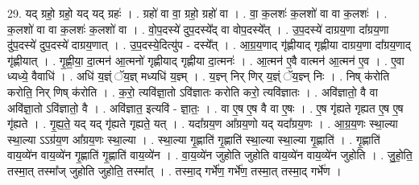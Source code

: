 \documentclass[17pt]{extarticle}
\begin{document}
29. यद् ग्रहो॒ ग्रहो॒ यद् यद् ग्रहः॑ । . ग्रहो॑ वा वा॒ ग्रहो॒ ग्रहो॑ वा । . वा॒ क॒लशः॑ क॒लशो॑ वा वा क॒लशः॑ । . क॒लशो॑ वा वा क॒लशः॑ क॒लशो॑ वा । . वो॒प॒दस्ये॑ दुप॒दस्ये᳚द् वा वोप॒दस्ये᳚त् । . उ॒प॒दस्ये॑ दाग्रय॒णा दा᳚ग्रय॒णा दु॑प॒दस्ये॑ दुप॒दस्ये॑ दाग्रय॒णात् । . उ॒प॒दस्ये॒दित्यु॑प - दस्ये᳚त् । . आ॒ग्र॒य॒णाद् गृ॑ह्णीयाद् गृह्णीया दाग्रय॒णा दा᳚ग्रय॒णाद् गृ॑ह्णीयात् । . गृ॒ह्णी॒या॒ दा॒त्मन॑ आ॒त्मनो॑ गृह्णीयाद् गृह्णीया दा॒त्मनः॑ । . आ॒त्मन॑ ए॒वै वात्मन॑ आ॒त्मन॑ ए॒व । . ए॒वा ध्यध्ये॒ वैवाधि॑ । . अधि॑ य॒ज्ञ्ं ॅय॒ज्ञ् मध्यधि॑ य॒ज्ञ्म् । . य॒ज्ञ्न् निर् णिर् य॒ज्ञ्ं ॅय॒ज्ञ्न् निः । . निष् क॑रोति करोति॒ निर् णिष् क॑रोति । . क॒रो॒ त्यवि॑ज्ञा॒तो ऽवि॑ज्ञातः करोति करो॒ त्यवि॑ज्ञातः । . अवि॑ज्ञातो॒ वै वा अवि॑ज्ञा॒तो ऽवि॑ज्ञातो॒ वै । . अवि॑ज्ञात॒ इत्यवि॑ - ज्ञा॒तः॒ । . वा ए॒ष ए॒ष वै वा ए॒षः । . ए॒ष गृ॑ह्यते गृह्यत ए॒ष ए॒ष गृ॑ह्यते । . गृ॒ह्य॒ते॒ यद् यद् गृ॑ह्यते गृह्यते॒ यत् । . यदा᳚ग्रय॒ण आ᳚ग्रय॒णो यद् यदा᳚ग्रय॒णः । . आ॒ग्र॒य॒णः स्था॒ल्या स्था॒ल्या ऽऽग्र॑य॒ण आ᳚ग्रय॒णः स्था॒ल्या । . स्था॒ल्या गृ॒ह्णाति॑ गृ॒ह्णाति॑ स्था॒ल्या स्था॒ल्या गृ॒ह्णाति॑ । . गृ॒ह्णाति॑ वाय॒व्ये॑न वाय॒व्ये॑न गृ॒ह्णाति॑ गृ॒ह्णाति॑ वाय॒व्ये॑न । . वा॒य॒व्ये॑न जुहोति जुहोति वाय॒व्ये॑न वाय॒व्ये॑न जुहोति । . जु॒हो॒ति॒ तस्मा॒त् तस्मा᳚ज् जुहोति जुहोति॒ तस्मा᳚त् । . तस्मा॒द् गर्भे॑ण॒ गर्भे॑ण॒ तस्मा॒त् तस्मा॒द् गर्भे॑ण । \newline
\end{document}
